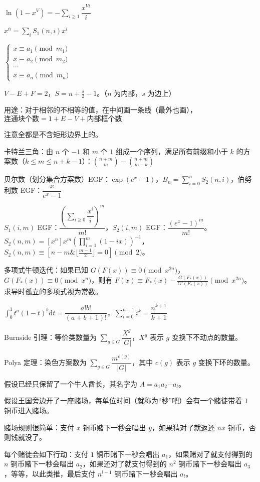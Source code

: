 \documentclass[12pt]{ctexart}
\begin{document}
$\ln (1-x^V)=-\sum\limits_{i\ge1}\dfrac{x^{Vi}}{i}$

$x^{\bar n}=\sum\limits_i S_1(n,i)x^i$

$\begin{cases}x\equiv a_1\pmod {m_1}\\x\equiv a_2\pmod {m_2}\\\cdots\\x\equiv a_n\pmod {m_n}\end{cases}$

$V-E+F=2$，$S=n+\frac s2-1$。（$n$ 为内部，$s$ 为边上）

用途：对于相邻的不相等的值，在中间画一条线（最外也画），$\text{连通块个数}=1+E-V+\text{内部框个数}$

注意全都是不含矩形边界上的。

卡特兰三角：由 $n$ 个 $-1$ 和 $m$ 个 $1$ 组成一个序列，满足所有前缀和小于 $k$ 的方案数（$k\le m\le n+k-1$）：$\binom{n+m}{m}-\binom{n+m}{m-k}$

贝尔数（划分集合方案数）EGF：$\exp(e^x-1)$，$B_n=\sum\limits_{i=0}^n S_2(n,i)$，伯努利数 EGF：$\dfrac{x}{e^x-1}$

$S_1(i,m)$ EGF：$\dfrac{(\sum\limits_{i\ge 0}\dfrac{x^i}i)^m}{m!}$，$S_2(i,m)$ EGF：$\dfrac{(e^x-1)^m}{m!}$。$S_2(n,m)=[x^n]x^m(\prod\limits_{i=1}^m(1-ix))^{-1}$，$S_2(n,m)\equiv [n-m\&\lfloor\frac{m-1}{2}\rfloor=0]\pmod 2$。

多项式牛顿迭代：如果已知 $G(F(x))\equiv0\pmod{x^{2n}}$，$G(F_*(x))\equiv0\pmod {x^n}$，则有 $F(x)\equiv F_*(x)-\frac{G(F_*(x))}{G'(F_*(x))}\pmod{x^{2n}}$。求导时孤立的多项式视为常数。

$\int_0^1 t^a(1-t)^b\mathrm{d}t=\dfrac{a!b!}{(a+b+1)!}$，$\sum\limits_{i=0}^{n-1}i^{\underline{k}}=\dfrac{n^{\underline{k+1}}}{k+1}$

Burnside 引理：等价类数量为 $\sum\limits_{g\in G}\dfrac{X^g}{|G|}$，$X^g$ 表示 $g$ 变换下不动点的数量。

Polya 定理：染色方案数为 $\sum\limits_{g\in G}\dfrac{m^{c(g)}}{|G|}$，其中 $c(g)$ 表示 $g$ 变换下环的数量。

假设已经只保留了一个牛人酋长，其名字为 $A=a_1a_2\cdots a_l$。

假设王国旁边开了一座赌场，每单位时间（就称为“秒”吧）会有一个赌徒带着 $1$ 铜币进入赌场。

赌场规则很简单：支付 $x$ 铜币赌下一秒会唱出 $y$，如果猜对了就返还 $nx$ 铜币，否则钱就没了。

每个赌徒会如下行动：支付 $1$ 铜币赌下一秒会唱出 $a_1$，如果赌对了就支付得到的 $n$ 铜币赌下一秒会唱出 $a_2$，如果还对了就支付得到的 $n^2$ 铜币赌下一秒会唱出 $a_3$，等等，以此类推，最后支付 $n^{l-1}$ 铜币赌下一秒会唱出 $a_l$。
\end{document}
